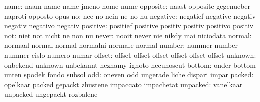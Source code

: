                      name: naam                      name
                           name                      jmeno
                           nome                      nume
                 opposite: naast                     opposite
                           gegenueber                naproti
                           opposto                   opus
                       no: nee                       no
                           nein                      ne
                           no                        nu
                 negative: negatief                  negative
                           negativ                   negativ
                           negativo                  negativ
                 positive: positief                  positive
                           positiv                   positiv
                           positivo                  positiv
                      not: niet                      not
                           nicht                     ne
                           non                       nu
                    never: nooit                     never
                           nie                       nikdy
                           mai                       niciodata
                   normal: normaal                   normal
                           normal                    normalni
                           normale                   normal
                   number: nummer                    number
                           nummer                    cislo
                           numero                    numar
                   offset: offset                    offset
                           offset                    offset
                           offset                    offset
                  unknown: onbekend                  unknown
                           unbekannt                 neznamy
                           ignoto                    necunoscut
                   bottom: onder                     bottom
                           unten                     spodek
                           fondo                     subsol
                      odd: oneven                    odd
                           ungerade                  liche
                           dispari                   impar
                   packed: opelkaar                  packed
                           gepackt                   zhustene
                           impaccato                 impachetat
                 unpacked: vanelkaar                 unpacked
                           ungepackt                 rozbalene
